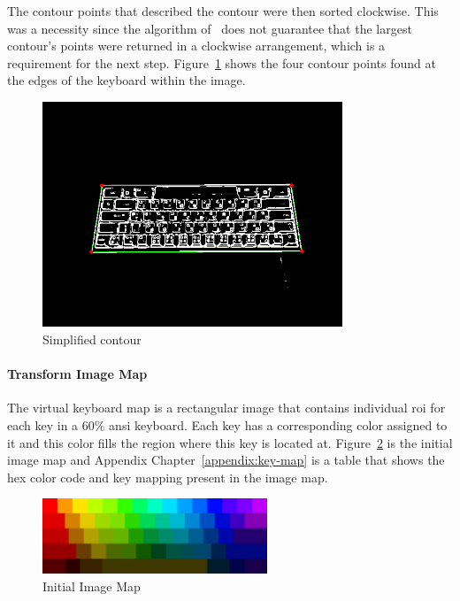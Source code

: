\documentclass{report}
\begin{document}
The contour points that described the contour were then sorted clockwise. This
was a necessity since the algorithm of~\cite{contours} does not guarantee that
the largest contour's points were returned in a clockwise arrangement, which is
a requirement for the next step. Figure~\ref{fig:metho-algo-largest-contour}
shows the four contour points found at the edges of the keyboard within the
image.

\begin{figure}[H]
	\centering
	\includegraphics[width=0.8\textwidth]{get-largest-contour.png}
	\caption{Simplified contour}
	\label{fig:metho-algo-largest-contour}
	\centering
\end{figure}


\paragraph{Transform Image Map}
The virtual keyboard map is a rectangular image that contains individual
\ac{roi} for each key in a 60\% \ac{ansi} keyboard. Each key has a corresponding
color assigned to it and this color fills the region where this key is located
at. Figure~\ref{fig:metho-algo-key-map} is the initial image map and Appendix
Chapter~\ref{appendix:key-map} is a table that shows the hex color code and key
mapping present in the image map.

\begin{figure}[H]
	\centering
	\includegraphics[width=0.6\textwidth]{image-map.png}
	\caption{Initial Image Map}
	\label{fig:metho-algo-key-map}
	\centering
\end{figure}
\end{document}
